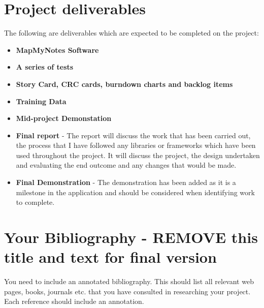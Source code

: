 \documentclass[11pt,fleqn,twoside]{article}
\begin{document}
\section{Project deliverables}
The following are deliverables which are expected to be completed on the project:
\begin{itemize}

  \item \textbf{MapMyNotes Software}

  \item \textbf{A series of tests}

  \item \textbf{Story Card, CRC cards, burndown charts and backlog items}

  \item \textbf{Training Data}

  \item \textbf{Mid-project Demonstation}

  \item \textbf{Final report} - The report will discuss the work that has been carried out, the process that I have followed any libraries or frameworks which have been used throughout the project. It will discuss the project, the design undertaken and evaluating the end outcome and any changes that would be made.

  \item \textbf{Final Demonstration} - The demonstration has been added as it is a milestone in the application and should be considered when identifying work to complete.

\end{itemize}

%
%
\section*{Your Bibliography - REMOVE this title and text for final version}
%
You need to include an annotated bibliography. This should list all relevant web pages, books, journals etc. that you have consulted in researching your project. Each reference should include an annotation.
\end{document}
